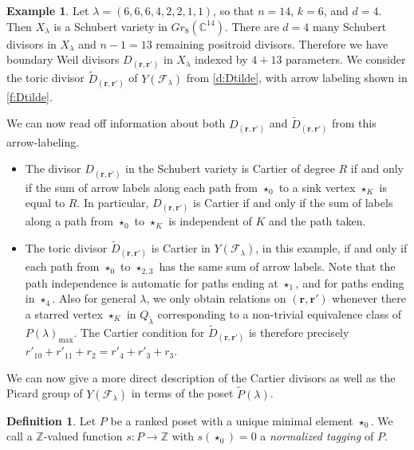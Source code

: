 \documentclass{amsart}
\theoremstyle{definition}
\newtheorem{defn}[thm]{Definition}
\newtheorem{example}[thm]{Example}
\numberwithin{equation}{section}
\newcommand{\FF}{\mathcal{F}}
\newcommand{\C}{\mathbb{C}}
\newcommand{\Z}{\mathbb{Z}}
\begin{document}
\begin{example}\label{ex:66642211}
Let $\lambda=(6,6,6,4,2,2,1,1)$, so that $n=14$, $k=6$, and $d=4$.
Then $X_\lambda$ is a Schubert variety in $Gr_8(\C^{14})$. There are $d=4$ many Schubert divisors in $X_\lambda$ and $n-1=13$ remaining positroid divisors. Therefore we have boundary Weil divisors $D_{(\mathbf r,\mathbf {r'})}$ in $X_\lambda$ indexed by $4+13$ parameters. We consider the toric divisor $\widetilde D_{(\mathbf r,\mathbf {r'})}$ of $Y(\FF_{\lambda})$ from \cref{d:Dtilde},
	with arrow labeling  shown in \cref{f:Dtilde}.

We can now read off information about both $D_{(\mathbf r,\mathbf {r'})}$ and $\widetilde D_{(\mathbf r,\mathbf {r'})}$ from this arrow-labeling. 
\begin {itemize}
\item The divisor $D_{(\mathbf r,\mathbf {r'})}$ in the Schubert variety is Cartier of degree $R$ if and only if the sum of arrow labels along each path from $\star_0$ to a sink vertex 
	$\star_K$ is equal to $R$. 
	In particular, $D_{(\mathbf r,\mathbf {r'})}$ is Cartier if and only if the sum of labels along a path from $\star_0$ to $\star_K$ is independent of $K$ and the path taken.
\item  The toric divisor $\widetilde D_{(\mathbf r,\mathbf {r'})}$ is Cartier in $Y(\FF_\lambda)$, in this example, 
	if and only 
	if 
each	path from $\star_0$ to $\star_{2,3}$ has the same sum of arrow labels.
Note that the path independence is automatic for paths ending at $\star_1$, and for paths ending in $\star_4$. Also for general $\lambda$, we only obtain relations on $(\mathbf r,\mathbf r')$ whenever there a starred vertex $\star_K$ in $Q_{\widetilde\lambda}$ corresponding to a non-trivial equivalence class of $P(\lambda)_{\max}$.  The Cartier condition for $\widetilde D_{(\mathbf r,\mathbf {r'})}$ is therefore precisely  $r'_{10}+r'_{11}+r_2=r'_4+r'_3+r_3$.
\end{itemize}




\end{example}


We can now give a more direct description of the Cartier divisors as well as the Picard group of $Y(\FF_\lambda)$ in terms of the poset $\widetilde P(\lambda)$. 
\begin{defn} \label{d:tagging}
Let $P$ be a ranked poset with a unique minimal element $\star_0$.
We call a $\Z$-valued function $s: P\to \Z$
with $s(\star_0)=0$ a \emph{normalized tagging} of $P$. 
\end{defn}
\end{document}
